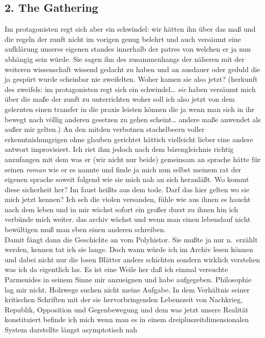 \documentclass[
]{article}
\author{}
\date{\vspace{-2.5em}}
\begin{document}
\subsection{2. The Gathering}\label{the-gathering}

Im protagonisten regt sich aber ein schwindel: wir hätten ihn über das
maß und die regeln der zunft nicht im vorigen genug belehrt und auch
versäumt eine aufklärung unseres eigenen standes innerhalb der patres
von welchen er ja nun abhängig sein würde. Sie sagen ihn des
zusammenhangs der näheren mit der weiteren wissenschaft wissend gedacht
zu haben und an ausdauer oder geduld die ja gespürt wurde scheinbar nie
zweifelten. Woher kamen sie also jetzt? (herkunft des zweifels: im
protagonisten regt sich ein schwindel\ldots{} \emph{sie} haben versäumt
mich über die maße der zunft zu unterrichten woher soll ich also jetzt
von dem gelernten einen transfer in die praxis leisten können die ja
wenn man sich in ihr bewegt nach völlig anderen gesetzen zu gehen
scheint\ldots{} andere maße anwendet als außer mir gelten.) An den
mitden verbotnen stachelbeern voller erkenntnishungrigen ohne glauben
gerichtet hättich vielleicht lieber eine andere antwort improvisiert.
Ich riet ihm jedoch nach dem bärengleichnis richtig anzufangen mit dem
was er (wir nicht nur beide) gemeinsam an sprache hätte für seinen
\emph{roman} wie er es nannte und finde ja mich nun selbst meinem rat
der eigenen sprache soweit folgend wie sie mich nah an sich heranläßt.
Wo kommt diese sicherheit her? Im faust heißts aus dem tode. Darf das
hier gelten wo sie mich jetzt kennen? Ich seh die violen versanden,
fühle wie aus ihnen es haucht nach dem leben und in mir wächst sofort
ein großer durst zu ihnen hin ich verbünde mich weiter. das archiv
wächst und wenn man einen lebenslauf nicht bewältigen muß man eben einen
anderen schreiben.\\
Damit fängt dann die Geschichte an vom Polyhistor. Sie mußte ja nur
n.~erzählt werden, kennen tat ich sie lange. Doch wann würde ich im
Archiv lesen können und dabei nicht nur die losen Blätter anders
schichten sondern wirklich verstehen was ich da eigentlich las. Es ist
eine Weile her daß ich einmal versuchte Parmenides in seinem Sinne mir
anzueignen und habe aufgegeben. Philosophie lag mir nicht. Holzwege
suchen nicht meine Aufgabe. In dem Verhältnis seiner kritischen
Schriften mit der sie hervorbringenden Lebenszeit von Nachkrieg,
Republik, Opposition und Gegenbewegung und dem was jetzt unsere Realität
konstituiert befinde ich mich wenn man es in einem
dreipluszeitdimensionalen System darstellte längst asymptotisch nah
\end{document}

